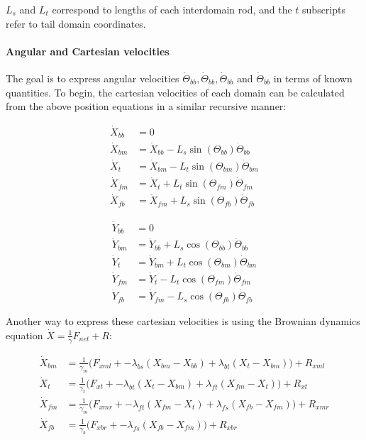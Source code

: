 \documentclass[10pt]{article} %
\begin{document}
$L_s$ and $L_t$ correspond to lengths of each interdomain rod, and the $t$ subscripts refer to tail domain coordinates.\\

\paragraph{Angular and Cartesian velocities}
The goal is to express angular velocities $\dot{\Theta}_{bb}, \dot{\Theta}_{bb}, \dot{\Theta}_{bb}$ and $\dot{\Theta}_{bb}$ in terms of known quantities. To begin, the cartesian velocities of each domain can be calculated from the above position equations in a similar recursive manner:

\noindent\begin{minipage}{0.49\linewidth}
\begin{align}
  \dot{X}_{bb} &= 0 \\
  \dot{X}_{bm} &= \dot{X}_{bb} - L_{s}\sin(\Theta_{bb})\dot{\Theta}_{bb} \label{cartesian-bmx}\\
  \dot{X}_{t } &= \dot{X}_{bm} - L_{t}\sin(\Theta_{bm})\dot{\Theta}_{bm} \\
  \dot{X}_{fm} &= \dot{X}_{t } + L_{t}\sin(\Theta_{fm})\dot{\Theta}_{fm} \\
  \dot{X}_{fb} &= \dot{X}_{fm} + L_{s}\sin(\Theta_{fb})\dot{\Theta}_{fb}
\end{align}
\end{minipage}
\begin{minipage}{0.49\linewidth}
\begin{align}                                                                          
  \dot{Y}_{bb} &= 0 \\                                                        
  \dot{Y}_{bm} &= \dot{Y}_{bb} + L_{s}\cos(\Theta_{bb})\dot{\Theta}_{bb} \\
  \dot{Y}_{t}  &= \dot{Y}_{bm} + L_{t}\cos(\Theta_{bm})\dot{\Theta}_{bm} \\
  \dot{Y}_{fm} &= \dot{Y}_{t } - L_{t}\cos(\Theta_{fm})\dot{\Theta}_{fm} \\
  \dot{Y}_{fb} &= \dot{Y}_{fm} - L_{s}\cos(\Theta_{fb})\dot{\Theta}_{fb}
\end{align}
\end{minipage}
\vspace{.5cm}

Another way to express these cartesian velocities is using the Brownian dynamics equation $\dot{X} = \frac1\gamma F_{net} + R$:

\begin{align}  
  \dot{X}_{bm} &= \frac{1}{\gamma_m} \Big(F_{xml} + - \lambda_{bs}(X_{bm} - X_{bb}) + \lambda_{bt}(X_{t } - X_{bm}) \Big) + R_{xml} \label{brownian-bmx}\\
  \dot{X}_{t } &= \frac{1}{\gamma_t} \Big(F_{xt } + - \lambda_{bt}(X_{t } - X_{bm}) + \lambda_{ft}(X_{fm} - X_{t }) \Big) + R_{xt } \\
  \dot{X}_{fm} &= \frac{1}{\gamma_m} \Big(F_{xmr} + - \lambda_{ft}(X_{fm} - X_{t }) + \lambda_{fs}(X_{fb} - X_{fm}) \Big) + R_{xmr} \\
  \dot{X}_{fb} &= \frac{1}{\gamma_b} \Big(F_{xbr} + - \lambda_{fs}(X_{fb} - X_{fm}) \Big) + R_{xbr}
\end{align}
\end{document}
